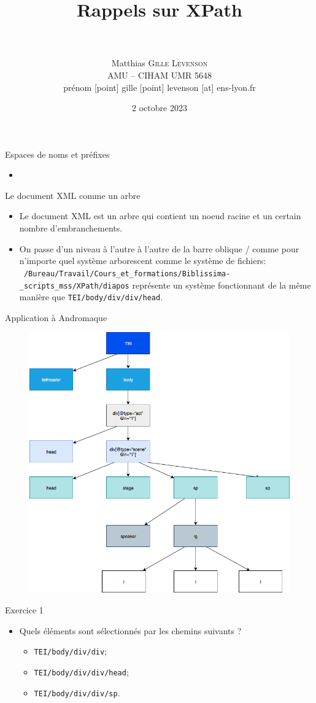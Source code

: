 \documentclass[11pt,aspectratio=169]{beamer}
\date[2 octobre 2023]{2 octobre 2023}
\author[Matthias \textsc{Gille Levenson}]{\\~\\ Matthias \textsc{Gille Levenson}\\   {\scriptsize AMU -- CIHAM UMR 5648}\\ {\tiny prénom [point] gille [point] levenson [at] ens-lyon.fr}\vspace{-1cm}}
\title[Transcription automatisée et HTR]{Rappels sur XPath}
\begin{document}
\maketitle



\begin{frame}{Espaces de noms et préfixes}
\begin{itemize}
\item 
\end{itemize}
\end{frame}

\begin{frame}{Le document XML comme un arbre}
\begin{itemize}
\item Le document XML est un arbre qui contient un noeud racine et un certain nombre d'embranchements.
\item On passe d'un niveau à l'autre à l'autre de la barre oblique / comme pour n'importe quel système arborescent comme le système de fichiers: \texttt{~/Bureau/Travail/Cours\_et\_formations/Biblissima-\_scripts\_mss/XPath/diapos} représente un système fonctionnant de la même manière que \texttt{TEI/body/div/div/head}.
\end{itemize}
\end{frame}


\begin{frame}{Application à Andromaque}
\begin{figure}
\includegraphics[width=.4\textwidth]{img/andromaque.png}
\end{figure}
\end{frame}

\begin{frame}{Exercice 1}
\begin{itemize}
\item Quels éléments sont sélectionnés par les chemins suivants ?
\begin{itemize}
\item \texttt{TEI/body/div/div};
\item \texttt{TEI/body/div/div/head};
\item \texttt{TEI/body/div/div/sp}.
\end{itemize}
\end{itemize}
\end{frame}
\end{document}
